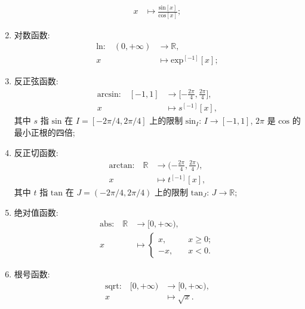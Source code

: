 \begin{definition}
\begin{enumerate}
\begin{align*}
                  x                                      & \mapsto \frac{\mathrm{sin} {[x]}}{\mathrm{cos} {[x]}};
              \end{align*}
        \item 对数函数:
              \begin{align*}
                  \text{$\mathrm{ln}$:} \quad
                  (0, +\infty) & \to \mathbb{R},                    \\
                  x            & \mapsto \mathrm{exp}^{[-1]} {[x]};
              \end{align*}
        \item 反正弦函数:
              \begin{align*}
                  \text{$\mathrm{arcsin}$:} \quad
                  [-1, 1] & \to \bigg[ {-\frac{2\pi}{4}}, \frac{2\pi}{4} \bigg], \\
                  x       & \mapsto s^{[-1]} {[x]},
              \end{align*}
              其中 $s$ 指 $\mathrm{sin}$ 在 $I = [-2\pi/4, 2\pi/4]$ 上的限制 $\mathrm{sin}_I$: $I \to [-1, 1]$, $2\pi$ 是 $\mathrm{cos}$ 的最小正根的四倍;
        \item 反正切函数:
              \begin{align*}
                  \text{$\mathrm{arctan}$:} \quad
                  \mathbb{R} & \to \bigg( {-\frac{2\pi}{4}}, \frac{2\pi}{4} \bigg), \\
                  x          & \mapsto t^{[-1]} {[x]},
              \end{align*}
              其中 $t$ 指 $\mathrm{tan}$ 在 $J = (-2\pi/4, 2\pi/4)$ 上的限制 $\mathrm{tan}_J$: $J \to \mathbb{R}$;
        \item 绝对值函数:
              \begin{align*}
                  \text{$\mathrm{abs}$:} \quad
                  \mathbb{R} & \to [0, +\infty),             \\
                  x          & \mapsto \begin{cases}
                                           x,  & \quad x \geq 0; \\
                                           -x, & \quad x < 0.
                                       \end{cases}
              \end{align*}
        \item 根号函数:
              \begin{align*}
                  \text{$\mathrm{sqrt}$:} \quad
                  [0, +\infty) & \to [0, +\infty), \\
                  x            & \mapsto \sqrt{x}.
              \end{align*}
    \end{enumerate}
\end{definition}

